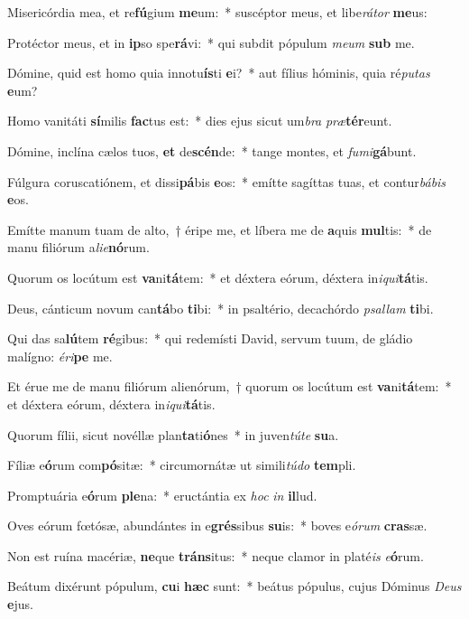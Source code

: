 \item Misericórdia mea, et re\textbf{fú}gium \textbf{me}um:~* suscéptor meus, et libe\textit{rá}\textit{tor} \textbf{me}us:
\item Protéctor meus, et in \textbf{ip}so spe\textbf{rá}vi:~* qui subdit pópulum \textit{me}\textit{um} \textbf{sub} me.
\item Dómine, quid est homo quia innotu\textbf{ís}ti \textbf{e}i?~* aut fílius hóminis, quia ré\textit{pu}\textit{tas} \textbf{e}um?
\item Homo vanitáti \textbf{sí}milis \textbf{fac}tus est:~* dies ejus sicut um\textit{bra} \textit{præ}\textbf{tér}eunt.
\item Dómine, inclína cælos tuos, \textbf{et} de\textbf{scén}de:~* tange montes, et \textit{fu}\textit{mi}\textbf{gá}bunt.
\item Fúlgura coruscatiónem, et dissi\textbf{pá}bis \textbf{e}os:~* emítte sagíttas tuas, et contur\textit{bá}\textit{bis} \textbf{e}os.
\item Emítte manum tuam de alto,~† éripe me, et líbera me de \textbf{a}quis \textbf{mul}tis:~* de manu filiórum a\textit{li}\textit{e}\textbf{nó}rum.
\item Quorum os locútum est \textbf{va}ni\textbf{tá}tem:~* et déxtera eórum, déxtera in\textit{i}\textit{qui}\textbf{tá}tis.
\item Deus, cánticum novum can\textbf{tá}bo \textbf{ti}bi:~* in psaltério, decachórdo \textit{psal}\textit{lam} \textbf{ti}bi.
\item Qui das sa\textbf{lú}tem \textbf{ré}gibus:~* qui redemísti David, servum tuum, de gládio malígno: \textit{é}\textit{ri}\textbf{pe} me.
\item Et érue me de manu filiórum alienórum,~† quorum os locútum est \textbf{va}ni\textbf{tá}tem:~* et déxtera eórum, déxtera in\textit{i}\textit{qui}\textbf{tá}tis.
\item Quorum fílii, sicut novéllæ plan\textbf{ta}ti\textbf{ó}nes~* in juven\textit{tú}\textit{te} \textbf{su}a.
\item Fíliæ e\textbf{ó}rum com\textbf{pó}sitæ:~* circumornátæ ut simili\textit{tú}\textit{do} \textbf{tem}pli.
\item Promptuária e\textbf{ó}rum \textbf{ple}na:~* eructántia ex \textit{hoc} \textit{in} \textbf{il}lud.
\item Oves eórum fœtósæ, abundántes in e\textbf{grés}sibus \textbf{su}is:~* boves e\textit{ó}\textit{rum} \textbf{cras}sæ.
\item Non est ruína macériæ, \textbf{ne}que \textbf{tráns}itus:~* neque clamor in platé\textit{is} \textit{e}\textbf{ó}rum.
\item Beátum dixérunt pópulum, \textbf{cu}i \textbf{hæc} sunt:~* beátus pópulus, cujus Dóminus \textit{De}\textit{us} \textbf{e}jus.
